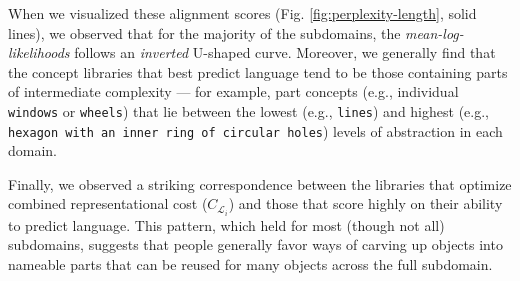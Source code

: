 When we visualized these alignment scores (Fig. \ref{fig:perplexity-length}, solid lines), we observed that for the majority of the subdomains, the \textit{mean-log-likelihoods} follows an \textit{inverted} U-shaped curve.
Moreover, we generally find that the concept libraries that best predict language tend to be those containing parts of intermediate complexity --- for example, part concepts (e.g., individual \texttt{windows} or \texttt{wheels}) that lie between the lowest (e.g., \texttt{lines}) and highest (e.g., \texttt{hexagon with an inner ring of circular holes}) levels of abstraction in each domain.

Finally, we observed a striking correspondence between the libraries that optimize combined representational cost ($C_{\mathcal{L}_i}$) and those that score highly on their ability to predict language. 
This pattern, which held for most (though not all) subdomains, suggests that people generally favor ways of carving up objects into nameable parts that can be reused for many objects across the full subdomain. 




